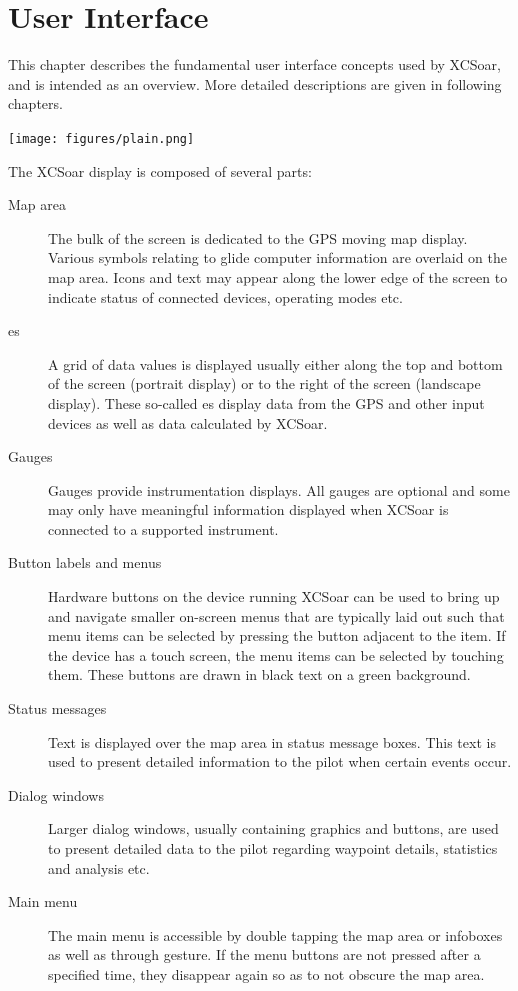 \chapter{User Interface}\label{cha:interface}
This chapter describes the fundamental user interface concepts used by
XCSoar, and is intended as an overview.  More detailed descriptions
are given in following chapters.


\begin{center}
\texttt{[image: figures/plain.png]}
\end{center}

The XCSoar display is composed of several parts:
\begin{description}
\item[Map area] The bulk of the screen is dedicated to the GPS moving map
display. Various symbols relating to glide computer information are overlaid 
on the map area. Icons and text may appear along the lower edge of the screen
to indicate status of connected devices, operating modes etc.
\item[{\InfoBox}es] A grid of data values is displayed usually either along
the top and bottom of the screen (portrait display) or to the right of the
screen (landscape display).  These so-called {\InfoBox}es display data from the
GPS and other input devices as well as data calculated by XCSoar.
\item[Gauges]  Gauges provide instrumentation displays. All gauges are optional
and some may only have meaningful information displayed when XCSoar is
connected to a supported instrument.
\item[Button labels and menus] Hardware buttons on the device running XCSoar
can be used to bring up and navigate smaller on-screen menus that are
typically laid out such that menu items can be selected by pressing the
button adjacent to the item.  If the device has a touch screen, the menu
items can be selected by touching them.  These buttons are drawn in black
text on a green background.
\item[Status messages] Text is displayed over the map area in status message
boxes.  This text is used to present detailed information to the pilot when
certain events occur.
\item[Dialog windows] Larger dialog windows, usually containing graphics and
buttons, are used to present detailed data to the pilot regarding waypoint
details, statistics and analysis etc.
\item[Main menu] The main menu is accessible by double tapping the map area or
infoboxes as well as through gesture. If the menu buttons are
not pressed after a specified time, they disappear again so as to not obscure the map area.
\end{description}

